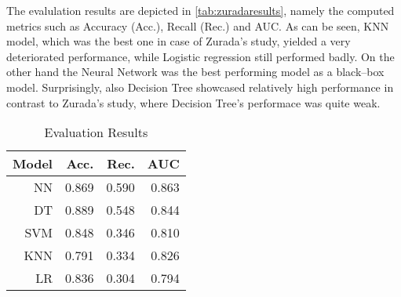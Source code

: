 The evalulation results are depicted in \autoref{tab:zuradaresults}, namely the computed metrics such as Accuracy (Acc.), Recall (Rec.) and AUC.
As can be seen, KNN model, which was the best one in case of Zurada's study, yielded a very deteriorated performance, while Logistic regression still performed badly.
On the other hand the Neural Network was the best performing model as a black--box model. Surprisingly, also Decision Tree showcased relatively high performance in contrast to Zurada's study, where Decision Tree's performace was quite weak.
\begin{table}[H]
    \small
    \setlength{\tabcolsep}{8pt}
    \renewcommand{\arraystretch}{1.3}
    \centering
    \caption[Evaluation Results \citep{zurada2014classification}]{Evaluation Results \citep{zurada2014classification}}\label{tab:zuradaresults}
    \begin{tabular}{r r r r}
    \toprule
    Model & Acc. & Rec. & AUC\\
    \midrule
    \hline
    NN & 0.869 & 0.590 & 0.863 \\
    DT & 0.889 & 0.548 & 0.844 \\
    SVM & 0.848 & 0.346 & 0.810 \\
    KNN & 0.791 & 0.334 & 0.826 \\
    LR & 0.836 & 0.304 & 0.794 \\
    \hline
    \bottomrule
    \end{tabular}
    \vspace{0.35em}
    
    \vspace{-1em}
\end{table}


